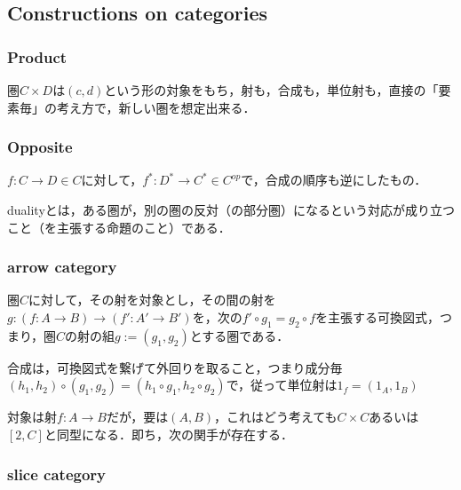 \documentclass[uplatex, 12pt, dvipdfmx]{jsarticle}
\begin{document}
\subsection{Constructions on categories}

\subsubsection{Product}

圏$C\times D$は$(c,d)$という形の対象をもち，射も，合成も，単位射も，直接の「要素毎」の考え方で，新しい圏を想定出来る．

\subsubsection{Opposite}

$f:C\to D\in C$に対して，$f^*:D^*\to C^*\in C^{op}$で，合成の順序も逆にしたもの．

dualityとは，ある圏が，別の圏の反対（の部分圏）になるという対応が成り立つこと（を主張する命題のこと）である．

\subsubsection{arrow category}

圏$C$に対して，その射を対象とし，その間の射を$g:(f:A\to B)\to (f':A'\to B')$を，次の$f'\circ g_1=g_2\circ f$を主張する可換図式，つまり，圏$C$の射の組$g:=(g_1,g_2)$とする圏である．
\begin{center}\end{center}
合成は，可換図式を繋げて外回りを取ること，つまり成分毎$(h_1,h_2)\circ (g_1,g_2)=(h_1\circ g_1, h_2\circ g_2)$で，従って単位射は$1_f=(1_A,1_B)$

対象は射$f:A\to B$だが，要は$(A,B)$，これはどう考えても$C\times C$あるいは$[2,C]$と同型になる．即ち，次の関手が存在する．
\begin{center}\end{center}

\subsubsection{slice category}
\end{document}
